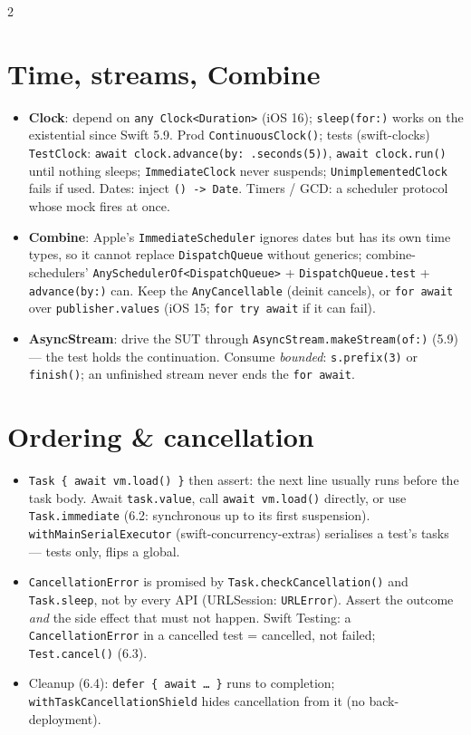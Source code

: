 \documentclass[8pt]{extarticle}
\newcommand\ct[1]{\texttt{#1}}
\begin{document}
\begin{multicols}{2}
\section{Time, streams, Combine}
\begin{itemize}
  \item \textbf{Clock}: depend on \ct{any Clock<Duration>} (iOS 16); \ct{sleep(for:)} works on the
        existential since Swift 5.9. Prod \ct{ContinuousClock()}; tests (swift-clocks)
        \ct{TestClock}: \ct{await clock.advance(by: .seconds(5))}, \ct{await clock.run()} until
        nothing sleeps; \ct{ImmediateClock} never suspends; \ct{UnimplementedClock} fails if used.
        Dates: inject \ct{() -> Date}. Timers / GCD: a scheduler protocol whose mock fires at once.
  \item \textbf{Combine}: Apple's \ct{ImmediateScheduler} ignores dates but has its own time
        types, so it cannot replace \ct{DispatchQueue} without generics; combine-schedulers'
        \ct{AnySchedulerOf<DispatchQueue>} + \ct{DispatchQueue.test} + \ct{advance(by:)} can.
        Keep the \ct{AnyCancellable} (deinit cancels), or \ct{for await} over
        \ct{publisher.values} (iOS 15; \ct{for try await} if it can fail).
  \item \textbf{AsyncStream}: drive the SUT through \ct{AsyncStream.makeStream(of:)} (5.9) — the
        test holds the continuation. Consume \emph{bounded}: \ct{s.prefix(3)} or \ct{finish()};
        an unfinished stream never ends the \ct{for await}.
\end{itemize}

\section{Ordering \& cancellation}
\begin{itemize}
  \item \ct{Task \{ await vm.load() \}} then assert: the next line usually runs before the task
        body. Await \ct{task.value}, call \ct{await vm.load()} directly, or use \ct{Task.immediate}
        (6.2: synchronous up to its first suspension). \ct{withMainSerialExecutor}
        (swift-concurrency-extras) serialises a test's tasks — tests only, flips a global.
  \item \ct{CancellationError} is promised by \ct{Task.checkCancellation()} and \ct{Task.sleep}, not
        by every API (URLSession: \ct{URLError}). Assert the outcome \emph{and} the side effect
        that must not happen. Swift Testing: a \ct{CancellationError} in a cancelled test =
        cancelled, not failed; \ct{Test.cancel()} (6.3).
  \item Cleanup (6.4): \ct{defer \{ await … \}} runs to completion;
        \ct{withTaskCancellationShield} hides cancellation from it (no back-deployment).
\end{itemize}


\end{multicols}
\end{document}
